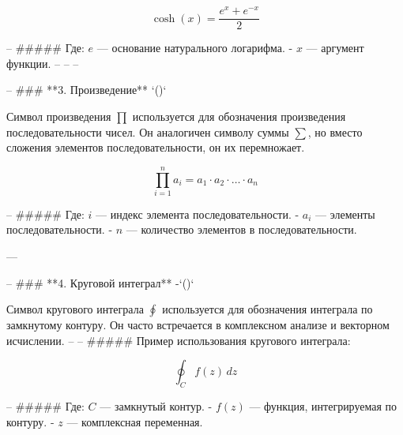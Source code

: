 \[ \cosh(x) = \frac{e^x + e^{{-}x}}{2} \]

-- #####  Где:
 \( e \) — основание натурального логарифма.
- \( x \) — аргумент функции.
-- 
-- 
--

--  ### **3. Произведение**  `(\prod)`

Символ произведения \(\prod\) используется для обозначения произведения последовательности чисел. Он аналогичен символу суммы \(\sum\), но вместо сложения элементов последовательности, он их перемножает.

 


\[ \prod_{i=1}^{n} a_i = a_1 \cdot a_2 \cdot \ldots \cdot a_n \]

-- #####  Где:
\( i \) — индекс элемента последовательности.
- \( a_i \) — элементы последовательности.
- \( n \) — количество элементов в последовательности.

---

--  ### **4. Круговой интеграл**
 -`(\oint)`

Символ кругового интеграла \(\oint\) используется для обозначения интеграла по замкнутому контуру. Он часто встречается в комплексном анализе и векторном исчислении.
--
-- ##### Пример использования  кругового интеграла:

\[ \oint_C f(z) \, dz \]

-- ##### Где:
\( C \) — замкнутый контур.
- \( f(z) \) — функция, интегрируемая по контуру.
- \( z \) — комплексная переменная.



